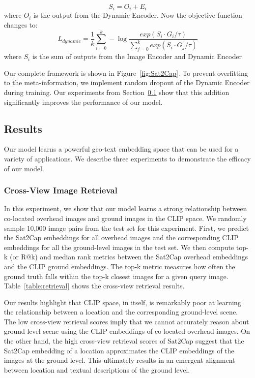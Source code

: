 \begin{equation}
    S_i = O_i + E_i
\end{equation}
where $O_i$ is the output from the Dynamic Encoder. Now the objective function changes to:
\begin{equation}
\label{eq:finaleq}
   L_{dynamic} = \frac{1}{k}\sum_{i=0}^{k} -\log\frac{exp(S_i \cdot G_i / \tau)}{\sum_{j=0}^{k} exp(S_i \cdot G_j / \tau) } 
\end{equation}
where $S_i$ is the sum of outputs from the Image Encoder and Dynamic Encoder 

Our complete framework is shown in Figure~\ref{fig:Sat2Cap}. To prevent overfitting to the meta-information, we implement random dropout of the Dynamic Encoder during training. Our experiments from Section~\ref{sec:sat2cap_results} show that this addition significantly improves the performance of our model.

\subsection{Results}
\label{sec:sat2cap_results}
Our model learns a powerful geo-text embedding space that can be used for a variety of applications. We describe three experiments to demonstrate the efficacy of our model.
\subsubsection{Cross-View Image Retrieval}
In this experiment, we show that our model learns a strong relationship between co-located overhead images and ground images in the CLIP space. We randomly sample 10,000 image pairs from the test set for this experiment. First, we predict the Sat2Cap embeddings for all overhead images and the corresponding CLIP embeddings for all the ground-level images in the test set. We then compute top-k (or R@k) and median rank metrics between the Sat2Cap overhead embeddings and the CLIP ground embeddings. The top-k metric measures how often the ground truth falls within the top-k closest images for a given query image. Table~\ref{table:retrieval} shows the cross-view retrieval results.

Our results highlight that CLIP space, in itself, is remarkably poor at learning the relationship between a location and the corresponding ground-level scene. The low cross-view retrieval scores imply that we cannot accurately reason about ground-level scene using the CLIP embeddings of co-located overhead images. On the other hand,  the high cross-view retrieval scores of Sat2Cap suggest that the Sat2Cap embedding of a location approximates the CLIP embeddings of the images at the ground-level. This ultimately results in an emergent alignment between location and textual descriptions of the ground level.
